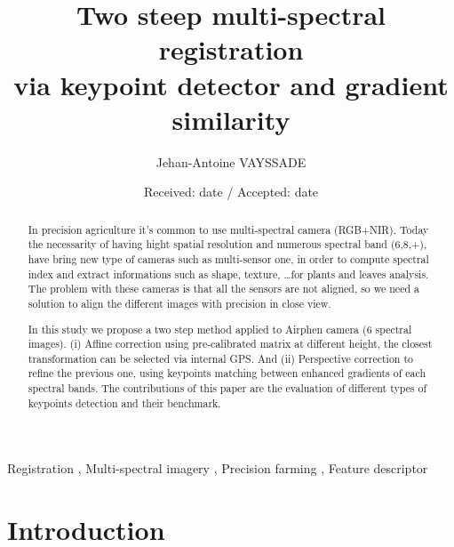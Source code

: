 \documentclass[]{elsarticle}
\begin{document}
	
	\onecolumn
	
	\begin{abstract}
		In precision agriculture it's common to use multi-spectral camera (RGB+NIR).
		Today the necessarity of having hight spatial resolution and numerous spectral band (6,8,+), have bring new type of cameras such as multi-sensor one,
		in order to compute spectral index and extract informations such as shape, texture, \dots for plants and leaves analysis.
		The problem with these cameras is that all the sensors are not aligned, so we need a solution to align the different images with precision in close view.
		
		In this study we propose a two step method applied to Airphen camera (6 spectral images).
		(i) Affine correction using pre-calibrated matrix at different height, the closest transformation can be selected via internal GPS.
		And (ii) Perspective correction to refine the previous one, using keypoints matching between enhanced gradients of each spectral bands.
		The contributions of this paper are the evaluation of different types of keypoints detection and their benchmark.
	\end{abstract}
	
	\begin{keyword}
		Registration \sep
		Multi-spectral imagery \sep
		Precision farming \sep
		Feature descriptor
	\end{keyword}
	
	\begin{frontmatter}
		\title{Two steep multi-spectral registration \\ via keypoint detector and gradient similarity}
		\author[unilu]{Jehan-Antoine VAYSSADE} 
		\address[myuni]{Agrosup D2A2E pole GestAd equipe agriculture de precision 21000 Dijon, France}
		\date{Received: date / Accepted: date}
	\end{frontmatter}
	
	\newpage
	\twocolumn
	
	\section{Introduction}
	
\end{document}
